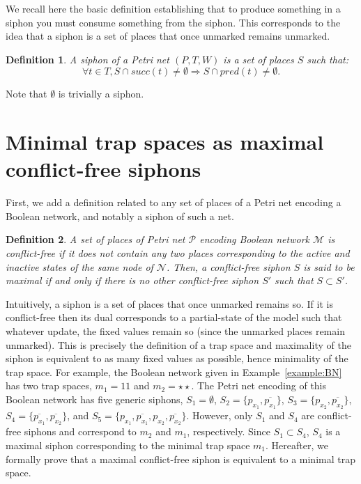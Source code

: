 \documentclass[preprint,12pt]{elsarticle}
\newtheorem{definition}{Definition}[section]
\begin{document}
We recall here the basic definition establishing that to produce something in a siphon you must consume something from the siphon.
This corresponds to the idea that a siphon is a set of places that once unmarked remains unmarked.

\begin{definition}

  A \emph{siphon} of a Petri net \((P, T, W)\) is a set of places \(S\) such that:
  \[\forall t\in T, S\cap succ(t)\not =\emptyset\Rightarrow S\cap pred(t)\not =\emptyset.\]

\end{definition}

Note that \(\emptyset\) is trivially a siphon.

\section{Minimal trap spaces as maximal conflict-free siphons}
\label{sec:Main_finding}

First, we add a definition related to any set of places of a Petri net encoding a Boolean network, and notably a siphon of such a net.

\begin{definition}

  A set of places of Petri net \(\mathcal{P}\) encoding Boolean network \(\mathcal{M}\) is \emph{conflict-free} if it does not contain any two places corresponding to the active and inactive states of the same \emph{node} of \(\mathcal{N}\).
  Then, a conflict-free siphon \(S\) is said to be \emph{maximal} if and only if there is no other conflict-free siphon \(S'\) such that \(S \subset S'\).

\end{definition}

Intuitively, a siphon is a set of places that once unmarked remains so.
If it is conflict-free then its dual corresponds to a partial-state of the model such that whatever update, the fixed values remain so (since the unmarked places remain unmarked).
This is precisely the definition of a trap space and maximality of the siphon is equivalent to as many fixed values as possible, hence minimality of the trap space.
For example, the Boolean network given in Example~\ref{example:BN} has two trap spaces, \(m_1 = 11\) and \(m_2 = \star\star\).
The Petri net encoding of this Boolean network has five generic siphons, \(S_1 = \emptyset\), \(S_2 = \{p_{x_1}, \overline{p_{x_1}}\}\), \(S_3 = \{p_{x_2}, \overline{p_{x_2}}\}\), \(S_4 = \{\overline{p_{x_1}}, \overline{p_{x_2}}\}\), and \(S_5 = \{p_{x_1}, \overline{p_{x_1}}, p_{x_2}, \overline{p_{x_2}}\}\).
However, only \(S_1\) and \(S_4\) are conflict-free siphons and correspond to \(m_2\) and \(m_1\), respectively.
Since \(S_1 \subset S_4\), \(S_4\) is a maximal siphon corresponding to the minimal trap space \(m_1\).
Hereafter, we formally prove that a maximal conflict-free siphon is equivalent to a minimal trap space.
\end{document}
